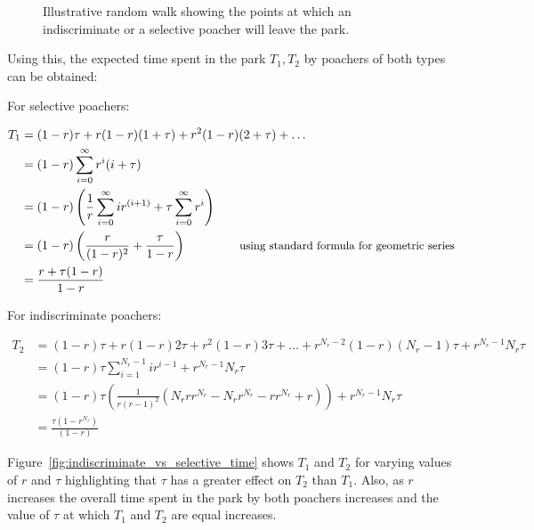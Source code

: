 \documentclass[10pt]{article}
\begin{document}
\begin{figure}[!htbp]
\begin{center}
    \end{center}
    \caption{Illustrative random walk showing the points at which an
    indiscriminate or a selective poacher will leave the park.}

    \label{fig:random_walk}
\end{figure}

Using this, the expected time spent in the park \(T_1, T_2\) by poachers of both
types can be obtained:

For selective poachers:

\begin{equation}
    \begin{split}
    T_1 &= (1-r) \tau + r(1-r)(1+ \tau) + r^2(1-r)(2+ \tau) + \dots\\
        &= (1-r) \sum_{i=0}^{\infty}r^i(i + \tau)\\
        &= (1-r) \left ( \frac{1} {r} \sum_{i=0} ^ {\infty} i r ^ {(i+1)} + \tau \sum_{i=0} ^ {\infty} r ^ i \right)\\
        &= (1-r)\left(\frac{r}{(1-r)^2} + \frac{\tau}{1-r}\right) \quad \quad \quad \quad \text{ \small{using standard
formula for geometric series}}\\
    &= \frac{r+\tau(1-r)}{1-r}
    \end{split}
\end{equation}

For indiscriminate poachers:

\begin{equation}
    \begin{split}
    T_2 &= (1-r)\tau + r(1-r)2\tau + r^2(1-r)3\tau + \dots + r^{N_r -
    2}(1-r)(N_r - 1)\tau + r^{N_r - 1}N_r\tau\\
        &= (1-r)\tau\sum_{i=1}^{N_r - 1}ir^{i-1} + r^{N_r - 1}N_r\tau \\
        &= (1-r)\tau\left(\frac{1}{r \left(r - 1\right)^{2}} \left(N_{r} r
r^{N_{r}} - N_{r} r^{N_{r}} - r r^{N_{r}} + r\right)\right) + r^{N_r - 1}N_r\tau \\
        &= \frac{\tau(1 - r^{N_r})}{(1 - r)}
    \end{split}
\end{equation}

Figure~\ref{fig:indiscriminate_vs_selective_time} shows \(T_1\) and \(T_2\) for
varying values of \(r\) and \(\tau\) highlighting that \(\tau\) has a greater
effect on \(T_2\) than \(T_1\). Also, as \(r\) increases the overall time spent
in the park by both poachers increases and the value of \(\tau\) at which
\(T_1\) and \(T_2\) are equal increases.
\end{document}
